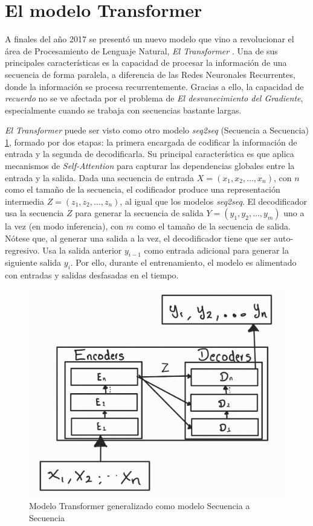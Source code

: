 \section{El modelo Transformer}

A finales del año 2017 se presentó un nuevo modelo que vino a revolucionar el área de Procesamiento
de Lenguaje Natural, \textit{El Transformer} \cite{Vaswani}. Una de sus principales características
es la capacidad de procesar la información de una secuencia de forma paralela, a diferencia de las
Redes Neuronales Recurrentes, donde la información se procesa recurrentemente. Gracias a ello, la
capacidad de \textit{recuerdo} no se ve afectada por el problema de \textit{El desvanecimiento del
Gradiente}, especialmente cuando se trabaja con secuencias bastante largas.

\textit{El Transformer} puede ser visto como otro modelo \textit{seq2seq} (Secuencia a Secuencia)
\ref{fig:trans_seq2sqe}, formado por dos etapas: la primera encargada de codificar la información de
entrada y la segunda de decodificarla. Su principal característica es que aplica mecanismos de
\textit{Self-Attention} para capturar las dependencias globales entre la entrada y la salida. Dada
una secuencia de entrada $X = (x_1, x_2, \dots, x_n)$, con $n$ como el tamaño de la secuencia, el
codificador produce una representación intermedia $Z = (z_1, z_2, \dots, z_n)$, al igual que los
modelos \textit{seq2seq}. El decodificador usa la secuencia $Z$ para generar la secuencia de salida
$Y = (y_1, y_2, \dots, y_m)$ uno a la vez (en modo inferencia), con $m$ como el tamaño de la secuencia
de salida. Nótese que, al generar una salida a la vez, el decodificador tiene que ser auto-regresivo.
Usa la salida anterior $y_{i-1}$ como entrada adicional para generar la siguiente salida $y_i$. Por
ello, durante el entrenamiento, el modelo es alimentado con entradas y salidas desfasadas en el tiempo.

\begin{figure}[ht!]
    \centering
    \includegraphics[width=0.4 \textwidth]{Chapters/2. Transformer/Figures/transformer/t_seq2seq.jpg}
    \caption{Modelo Transformer generalizado como modelo Secuencia a Secuencia}
    \label{fig:trans_seq2sqe}
\end{figure}


